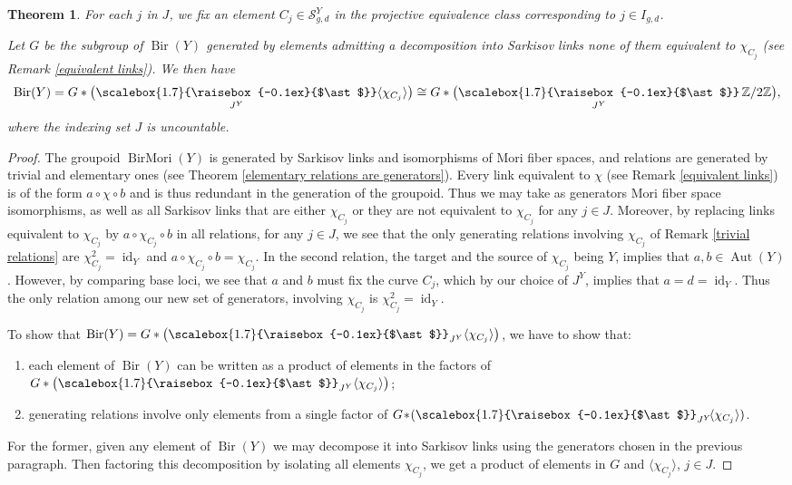 \documentclass[JEP,XML,SOM,Unicode,published]{cedram}
\theoremstyle{plain}
\newtheorem{theorem}{Theorem}[section]
\theoremstyle{definition}
\newcommand\Aut{\operatorname{Aut}}
\newcommand\Bir{\operatorname{Bir}}
\newcommand\BirMori{\operatorname{BirMori}}
\newcommand\id{\operatorname{id}}
\newcommand{\ZZ}{\mathbb{Z}}
\let\isom\cong
\newcommand{\freeprod}{\mathop{\scalebox{1.7}{\raisebox{-0.1ex}{$\ast$}}}}
\begin{document}
\begin{theorem}
For each $j$ in $J$, we fix an element $C_j \in \mathcal{S}_{g,d}^Y$ in the projective equivalence class corresponding to $j \in I_{g,d}$.

Let $G$ be the subgroup of $\Bir(Y)$ generated by elements admitting a decomposition into Sarkisov links none of them equivalent to $\chi_{C_j}$ (see Remark \ref{equivalent links}).
We then have
\[
\Bir(Y) = G \ast \bigl(\freeprod_{J^Y} \langle \chi_{C_j} \rangle \bigr) \isom G \ast \bigl(\freeprod_{J^Y} \ZZ/2\ZZ\bigr),
\]
where the indexing set $J$ is uncountable.
\end{theorem}

\begin{proof}
The groupoid $\BirMori(Y)$ is generated by Sarkisov links and isomorphisms of Mori fiber spaces, and relations are generated by trivial and elementary ones (see Theorem \ref{elementary relations are generators}).
Every link equivalent to $\chi$ (see Remark \ref{equivalent links}) is of the form $a\circ \chi \circ b$ and is thus redundant in the generation of the groupoid.
Thus we may take as generators Mori fiber space isomorphisms, as well as all Sarkisov links that are either $\chi_{C_j}$ or they are not equivalent to $\chi_{C_j}$ for any $j \in J$.
Moreover, by replacing links equivalent to $\chi_{C_j}$ by $a\circ \chi_{C_j} \circ b$ in all relations, for any $j \in J$, we see that the only generating relations involving $\chi_{C_j}$ of Remark \ref{trivial relations} are $\chi_{C_j}^2=\id_Y$ and $a\circ \chi_{C_j}\circ b=\chi_{C_j}$. In the second relation, the target and the source of $\chi_{C_j}$ being $Y$, implies that $a,b \in \Aut(Y)$.
However, by comparing base loci, we see that $a$ and $b$ must fix the curve $C_j$, which by our choice of $J^Y$, implies that $a = d = \id_Y$.
Thus the only relation among our new set of generators, involving $\chi_{C_j}$ is $\chi_{C_j}^2=\id_Y$.

To show that $\Bir(Y) = G \ast \left(\freeprod_{J^Y} \langle \chi_{C_j} \rangle \right)$, we have to show that:
\begin{enumerate}
\item each element of $\Bir(Y)$ can be written as a product of elements in the factors of $G \ast \left(\freeprod_{J^Y} \langle \chi_{C_j} \rangle \right)$;
\item generating relations involve only elements from a single factor of \hbox{$G \!\ast\!(\freeprod_{J^Y}\! \langle \chi_{C_j} \rangle)$}.
\end{enumerate}
For the former, given any element of $\Bir(Y)$ we may decompose it into Sarkisov links using the generators chosen in the previous paragraph.
Then factoring this decomposition by isolating all elements $\chi_{C_j}$, we get a product of elements in $G$ and $\langle \chi_{C_j} \rangle$, $j\in J$.


\end{proof}
\end{document}
